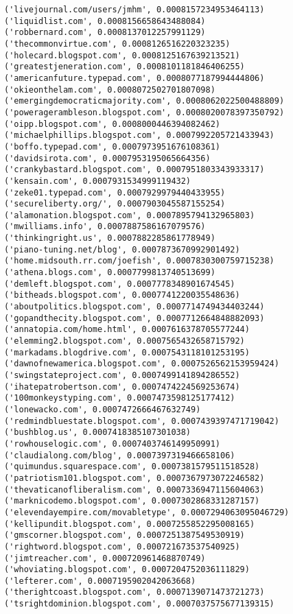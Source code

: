 \documentclass[11pt]{article}
\begin{document}
\begin{Verbatim}[commandchars=\\\{\}]
('livejournal.com/users/jmhm', 0.0008157234953464113)
('liquidlist.com', 0.0008156658643488084)
('robbernard.com', 0.0008137012257991129)
('thecommonvirtue.com', 0.0008126516220323235)
('holecard.blogspot.com', 0.0008125167639213521)
('greatestjeneration.com', 0.0008101181846406255)
('americanfuture.typepad.com', 0.0008077187994444806)
('okieonthelam.com', 0.0008072502701807098)
('emergingdemocraticmajority.com', 0.0008062022500488809)
('poweragerambleson.blogspot.com', 0.0008020078397350792)
('oipp.blogspot.com', 0.0008000446394082462)
('michaelphillips.blogspot.com', 0.0007992205721433943)
('boffo.typepad.com', 0.0007973951676108361)
('davidsirota.com', 0.0007953195065664356)
('crankybastard.blogspot.com', 0.0007951803343933317)
('kensain.com', 0.0007931534999119432)
('zeke01.typepad.com', 0.0007929979440433955)
('secureliberty.org/', 0.0007903045587155254)
('alamonation.blogspot.com', 0.0007895794132965803)
('mwilliams.info', 0.0007887586167079576)
('thinkingright.us', 0.0007882285861778949)
('piano-tuning.net/blog', 0.0007873670992901492)
('home.midsouth.rr.com/joefish', 0.0007830300759715238)
('athena.blogs.com', 0.0007799813740513699)
('demleft.blogspot.com', 0.0007778348901674545)
('bitheads.blogspot.com', 0.0007741220035548636)
('aboutpolitics.blogspot.com', 0.0007714749434403244)
('gopandthecity.blogspot.com', 0.0007712664848882093)
('annatopia.com/home.html', 0.0007616378705577244)
('elemming2.blogspot.com', 0.0007565432658715792)
('markadams.blogdrive.com', 0.0007543118101253195)
('dawnofnewamerica.blogspot.com', 0.0007526562153959424)
('swingstateproject.com', 0.0007499141894286552)
('ihatepatrobertson.com', 0.0007474224569253674)
('100monkeystyping.com', 0.0007473598125177412)
('lonewacko.com', 0.0007472666467632749)
('redmindbluestate.blogspot.com', 0.0007439397471719042)
('bushblog.us', 0.0007418385107301038)
('rowhouselogic.com', 0.0007403746149950991)
('claudialong.com/blog', 0.0007397319466658106)
('quimundus.squarespace.com', 0.0007381579511518528)
('patriotism101.blogspot.com', 0.0007367973072246582)
('thevaticanofliberalism.com', 0.0007336947115604063)
('marknicodemo.blogspot.com', 0.0007302868331287157)
('elevendayempire.com/movabletype', 0.0007294063095046729)
('kellipundit.blogspot.com', 0.0007255852295008165)
('gmscorner.blogspot.com', 0.0007251387549530919)
('rightword.blogspot.com', 0.000721673537540925)
('jimtreacher.com', 0.000720961468870749)
('whoviating.blogspot.com', 0.0007204752036111829)
('lefterer.com', 0.0007195902042063668)
('therightcoast.blogspot.com', 0.0007139071473721273)
('tsrightdominion.blogspot.com', 0.0007037575677139315)

\end{Verbatim}
\end{document}
